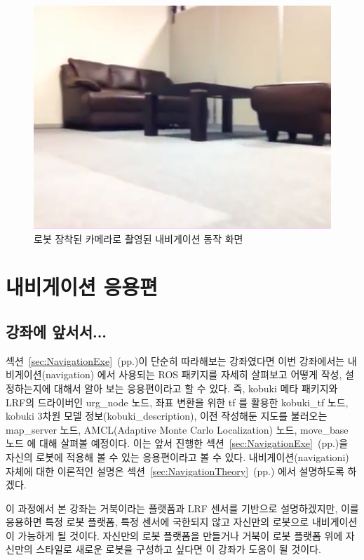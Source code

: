\begin{figure}[h]
\centering
\includegraphics[width=0.5\columnwidth]{pictures/chapter11/navigation_camera.png}
\caption{로봇 장착된 카메라로 촬영된 내비게이션 동작 화면}
\end{figure}

\section{내비게이션 응용편}

\subsection{강좌에 앞서서...}

섹션~\ref{sec:NavigationExe}~(pp.\pageref{sec:NavigationExe})이 단순히 따라해보는 강좌였다면 이번 강좌에서는 내비게이션(navigation) 에서 사용되는 ROS 패키지를 자세히 살펴보고 어떻게 작성, 설정하는지에 대해서 알아 보는 응용편이라고 할 수 있다. 즉, kobuki 메타 패키지와 LRF의 드라이버인 urg\_node 노드, 좌표 변환을 위한 tf 를 활용한 kobuki\_tf 노드, kobuki 3차원 모델 정보(kobuki\_description), 이전 작성해둔 지도를 불러오는 map\_server 노드, AMCL(Adaptive Monte Carlo Localization) 노드, move\_base 노드 에 대해 살펴볼 예정이다. 이는 앞서 진행한 섹션~\ref{sec:NavigationExe}~(pp.\pageref{sec:NavigationExe})을 자신의 로봇에 적용해 볼 수 있는 응용편이라고 볼 수 있다. 내비게이션(navigationi) 자체에 대한 이론적인 설명은 섹션~\ref{sec:NavigationTheory}~(pp.\pageref{sec:NavigationTheory}) 에서 설명하도록 하겠다.

이 과정에서 본 강좌는 거북이라는 플랫폼과 LRF 센서를 기반으로 설명하겠지만, 이를 응용하면 특정 로봇 플랫폼, 특정 센서에 국한되지 않고 자신만의 로봇으로 내비게이션 이 가능하게 될 것이다. 자신만의 로봇 플랫폼을 만들거나 거북이 로봇 플랫폼 위에 자신만의 스타일로 새로운 로봇을 구성하고 싶다면 이 강좌가 도움이 될 것이다.

